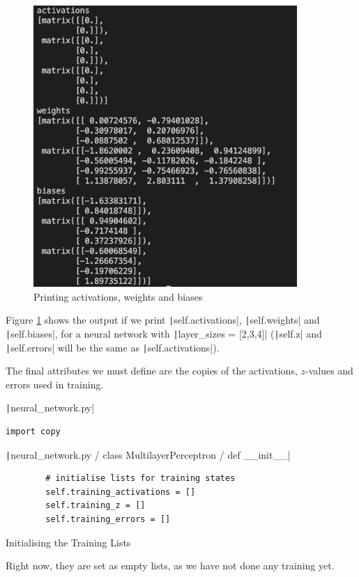 \documentclass[12pt]{report}
\newcommand{\pil}[1]{\protect\texttt|#1|}
\begin{document}
\begin{figure}[H]
\centering
\includegraphics[width=10cm]{ss6.1.png}
\caption{Printing activations, weights and biases}\label{fig:ss6.1}
\end{figure}

Figure \ref{fig:ss6.1} shows the output if we print \pil{self.activations}, \pil{self.weights} and \pil{self.biases}, for a neural network with \pil{layer_sizes = [2,3,4]} (\pil{self.z} and \pil{self.errors} will be the same as \pil{self.activations}).

The final attributes we must define are the copies of the activations, $z$-values and errors used in training.

\begin{listing}[H]
\pil{neural_network.py}
\begin{verbatim}
import copy
\end{verbatim}
\pil{neural_network.py / class MultilayerPerceptron / def __init__}
\begin{verbatim}
        # initialise lists for training states
        self.training_activations = []
        self.training_z = []
        self.training_errors = []
\end{verbatim}
\caption{Initialising the Training Lists}\label{cs:initialisingTrainingLists}
\end{listing}

Right now, they are set as empty lists, as we have not done any training yet.
\end{document}
